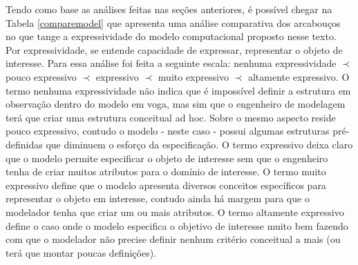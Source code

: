 Tendo como base as análises feitas nas seções anteriores, é possível chegar na Tabela \ref{comparemodel} que apresenta uma análise comparativa dos arcabouços no que tange a expressividade do modelo computacional proposto nesse texto. Por expressividade, se entende capacidade de expressar, representar o objeto de interesse. Para essa análise 
foi feita a seguinte escala: nenhuma expressividade $\prec$ pouco expressivo $\prec$ expressivo $\prec$ muito expressivo $\prec$ altamente expressivo. O termo nenhuma expressividade não indica que é impossível definir a estrutura em observação dentro do modelo em voga, mas sim que o engenheiro de modelagem terá que criar uma estrutura conceitual ad hoc. Sobre o mesmo aspecto reside pouco expressivo, contudo o modelo - neste caso - possui algumas estruturas pré-definidas que diminuem o esforço da especificação. O termo expressivo deixa claro que o modelo permite especificar o objeto de interesse sem que o engenheiro tenha de criar muitos atributos para o domínio de interesse. O termo muito expressivo define que o modelo apresenta diversos conceitos específicos para representar o objeto em interesse, contudo ainda há margem para que o modelador tenha que criar um ou mais atributos. O termo altamente expressivo define o caso onde o modelo especifica o objetivo de interesse muito bem fazendo com que o modelador não precise definir nenhum critério conceitual a mais (ou terá que montar poucas definições).   

